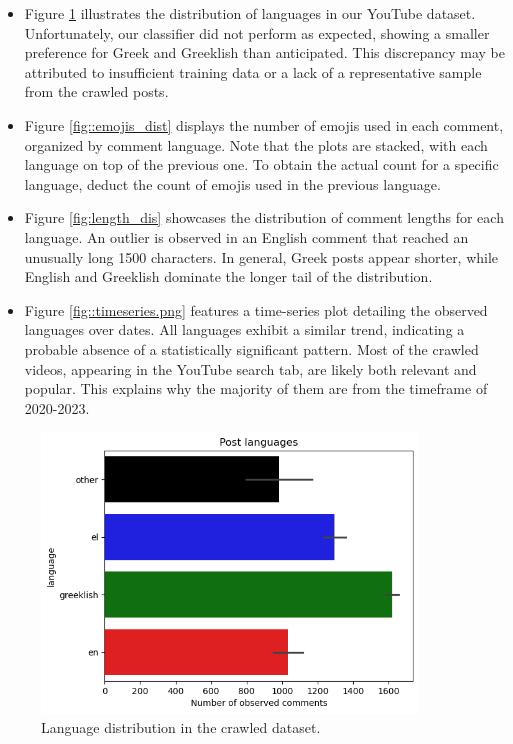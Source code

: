 \documentclass[11pt, a4paper]{article}
\begin{document}
	\begin{itemize}
		\item Figure \ref{fig::lang_dis} illustrates the distribution of languages in our YouTube dataset. Unfortunately, our classifier did not perform as expected, showing a smaller preference for Greek and Greeklish than anticipated. This discrepancy may be attributed to insufficient training data or a lack of a representative sample from the crawled posts.
		
		\item Figure \ref{fig::emojis_dist} displays the number of emojis used in each comment, organized by comment language. Note that the plots are stacked, with each language on top of the previous one. To obtain the actual count for a specific language, deduct the count of emojis used in the previous language.
		
		\item Figure \ref{fig:length_dis} showcases the distribution of comment lengths for each language. An outlier is observed in an English comment that reached an unusually long 1500 characters. In general, Greek posts appear shorter, while English and Greeklish dominate the longer tail of the distribution.
		
		\item Figure \ref{fig::timeseries.png} features a time-series plot detailing the observed languages over dates. All languages exhibit a similar trend, indicating a probable absence of a statistically significant pattern. Most of the crawled videos, appearing in the YouTube search tab, are likely both relevant and popular. This explains why the majority of them are from the timeframe of 2020-2023.
	\end{itemize}
	
	
	
	\begin{figure}
		\includegraphics[width=10cm]{lang_dis.png}
		\centering
		\caption{Language distribution in the crawled dataset.}
		\label{fig::lang_dis}
	\end{figure}
	
\end{document}
